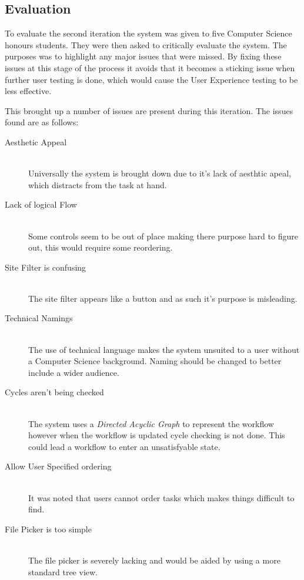 \documentclass[12pt,a4paper]{report}
\begin{document}
\subsection{Evaluation}
To evaluate the second iteration the system was given to five Computer Science honours students.
They were then asked to critically evaluate the system. The purposes was to highlight any major
issues that were missed. By fixing these issues at this stage of the process it avoids that it
becomes a sticking issue when further user testing is done, which would cause the User Experience
testing to be less effective.

This brought up a number of issues are present during this iteration. The issues found are
as follows:
\begin{description}
    \item[Aesthetic Appeal]\hfill \\
        Universally the system is brought down due to it's lack of aesthtic apeal, which distracts
        from the  task at hand.
    \item[Lack of logical Flow]\hfill \\
        Some controls seem to be out of place making there purpose hard to figure out, this
        would require some reordering.
    \item[Site Filter is confusing] \hfill \\
        The site filter appears like a button and as such it's purpose is misleading.
    \item[Technical Namings] \hfill \\
        The use of technical language makes the system unsuited to a user without
        a Computer Science background. Naming should be changed to better include
        a wider audience.
    \item[Cycles aren't being checked] \hfill \\
        The system uses a \emph{Directed Acyclic Graph} to represent the workflow however when the
        workflow is updated cycle checking is not done. This could lead a workflow to enter an
        unsatisfyable state.
    \item[Allow User Specified ordering] \hfill\\
        It was noted that users cannot order tasks which makes things difficult to find.
    \item[File Picker is too simple] \hfill \\
        The file picker is severely lacking and would be aided by using a more standard
        tree view.
\end{description}
\end{document}
